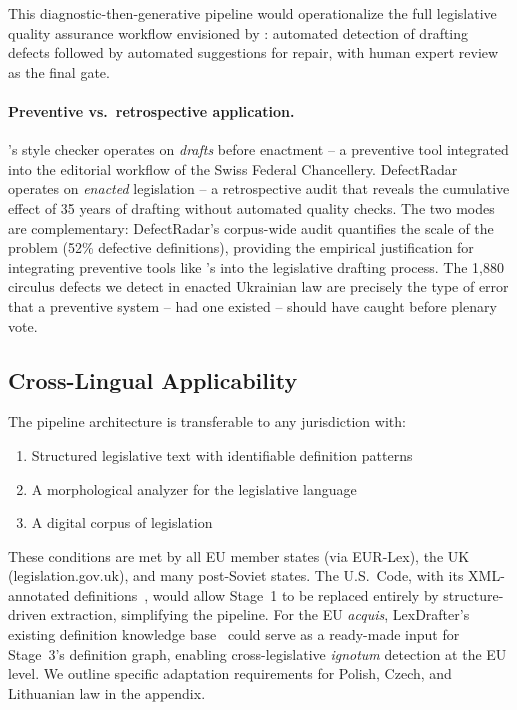 \documentclass[11pt]{article}
\begin{document}
This diagnostic-then-generative pipeline would operationalize the full legislative quality assurance workflow envisioned by \citet{hofler2012style}: automated detection of drafting defects followed by automated suggestions for repair, with human expert review as the final gate.

\paragraph{Preventive vs.\ retrospective application.}
\citeauthor{hofler2012style}'s style checker operates on \emph{drafts} before enactment -- a preventive tool integrated into the editorial workflow of the Swiss Federal Chancellery.
DefectRadar operates on \emph{enacted} legislation -- a retrospective audit that reveals the cumulative effect of 35 years of drafting without automated quality checks.
The two modes are complementary: DefectRadar's corpus-wide audit quantifies the scale of the problem (52\% defective definitions), providing the empirical justification for integrating preventive tools like \citeauthor{hofler2012style}'s into the legislative drafting process.
The 1{,}880 circulus defects we detect in enacted Ukrainian law are precisely the type of error that a preventive system -- had one existed -- should have caught before plenary vote.

\subsection{Cross-Lingual Applicability}

The pipeline architecture is transferable to any jurisdiction with:
\begin{enumerate}[nosep,leftmargin=*]
  \item Structured legislative text with identifiable definition patterns
  \item A morphological analyzer for the legislative language
  \item A digital corpus of legislation
\end{enumerate}

These conditions are met by all EU member states (via EUR-Lex), the UK (legislation.gov.uk), and many post-Soviet states.
The U.S.\ Code, with its XML-annotated definitions~\citep{hosabettu2025statutory}, would allow Stage~1 to be replaced entirely by structure-driven extraction, simplifying the pipeline.
For the EU \emph{acquis}, LexDrafter's existing definition knowledge base~\citep{chouhan2024lexdrafter} could serve as a ready-made input for Stage~3's definition graph, enabling cross-legislative \emph{ignotum} detection at the EU level.
We outline specific adaptation requirements for Polish, Czech, and Lithuanian law in the appendix.
\end{document}
